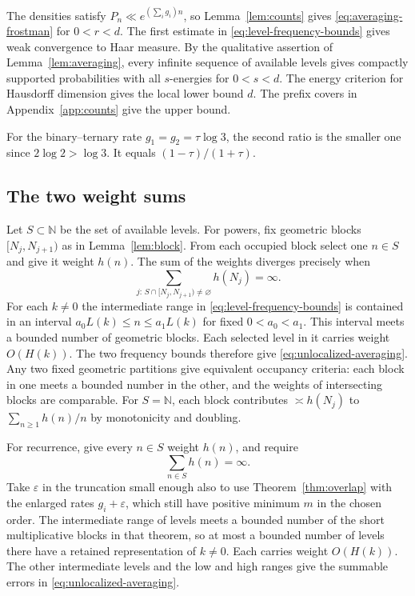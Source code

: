 \documentclass[11pt,a4paper,reqno]{amsart}
\theoremstyle{definition}
\theoremstyle{remark}
\numberwithin{equation}{section}
\begin{document}
The densities satisfy \(P_n\ll e^{(\sum_i g_i)n}\), so Lemma~\ref{lem:counts} gives \eqref{eq:averaging-frostman} for \(0<r<d\). The first estimate in \eqref{eq:level-frequency-bounds} gives weak convergence to Haar measure. By the qualitative assertion of Lemma~\ref{lem:averaging}, every infinite sequence of available levels gives compactly supported probabilities with all \(s\)-energies for \(0<s<d\). The energy criterion for Hausdorff dimension gives the local lower bound \(d\). The prefix covers in Appendix~\ref{app:counts} give the upper bound.

For the binary--ternary rate \(g_1=g_2=\tau\log3\), the second ratio is the smaller one since \(2\log2>\log3\). It equals \((1-\tau)/(1+\tau)\).

\subsection{The two weight sums}
Let \(S\subset\mathbb N\) be the set of available levels. For powers, fix geometric blocks \([N_j,N_{j+1})\) as in Lemma~\ref{lem:block}. From each occupied block select one \(n\in S\) and give it weight \(h(n)\). The sum of the weights diverges precisely when
\begin{equation}\label{eq:sparse-powers-construction}
    \sum_{j:\,S\cap[N_j,N_{j+1})\ne\varnothing} h(N_j)=\infty.
\end{equation}
For each \(k\ne0\) the intermediate range in \eqref{eq:level-frequency-bounds} is contained in an interval \(a_0 L(k)\le n\le a_1 L(k)\) for fixed \(0<a_0<a_1\). This interval meets a bounded number of geometric blocks. Each selected level in it carries weight \(O(H(k))\). The two frequency bounds therefore give \eqref{eq:unlocalized-averaging}. Any two fixed geometric partitions give equivalent occupancy criteria: each block in one meets a bounded number in the other, and the weights of intersecting blocks are comparable. For \(S=\mathbb N\), each block contributes \(\asymp h(N_j)\) to \(\sum_{n\ge1}h(n)/n\) by monotonicity and doubling.

For recurrence, give every \(n\in S\) weight \(h(n)\), and require
\begin{equation}\label{eq:sparse-recurrence-construction}
          \sum_{n\in S} h(n)=\infty.
\end{equation}
Take \(\varepsilon\) in the truncation small enough also to use Theorem~\ref{thm:overlap} with the enlarged rates \(g_i+\varepsilon\), which still have positive minimum \(m\) in the chosen order. The intermediate range of levels meets a bounded number of the short multiplicative blocks in that theorem, so at most a bounded number of levels there have a retained representation of \(k\ne0\). Each carries weight \(O(H(k))\). The other intermediate levels and the low and high ranges give the summable errors in \eqref{eq:unlocalized-averaging}.
\end{document}
